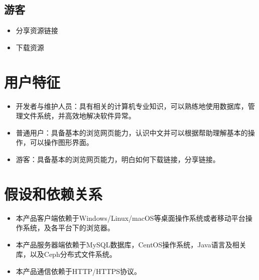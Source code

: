 \subsection{游客}
\begin{itemize}
	\item 分享资源链接
	\item 下载资源
\end{itemize}

\section{用户特征}
\begin{itemize}
	\item 开发者与维护人员：具有相关的计算机专业知识，可以熟练地使用数据库，管理文件系统，并高效地解决软件异常。
	\item 普通用户：具备基本的浏览网页能力，认识中文并可以根据帮助理解基本的操作，可以操作图形界面。
	\item 游客：具备基本的浏览网页能力，明白如何下载链接，分享链接。
\end{itemize}

\section{假设和依赖关系}
\begin{itemize}
	\item 本产品客户端依赖于Windows/Linux/macOS等桌面操作系统或者移动平台操作系统，及各平台下的浏览器。
	\item 本产品服务器端依赖于MySQL数据库，CentOS操作系统，Java语言及相关库，以及Ceph分布式文件系统。
	\item 本产品通信依赖于HTTP/HTTPS协议。
\end{itemize}
